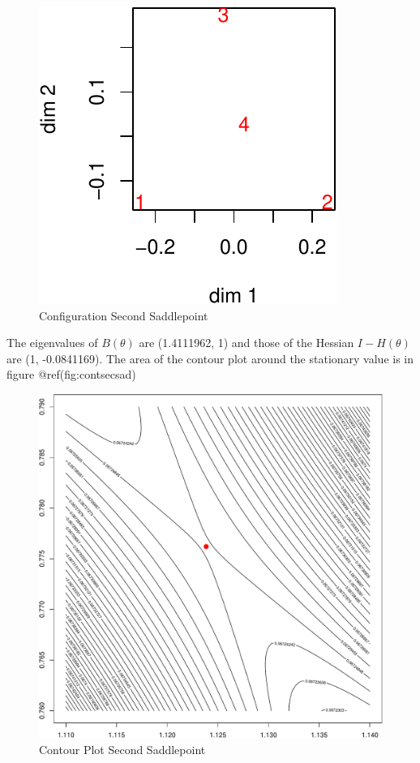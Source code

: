\documentclass[
  12pt,
  letterpaper,
  DIV=11,
  numbers=noendperiod]{scrreprt}
\theoremstyle{remark}
\begin{document}
\begin{figure}[H]

{\centering \includegraphics{spaces_files/figure-pdf/confsecsad-1.pdf}

}

\caption{Configuration Second Saddlepoint}

\end{figure}%

The eigenvalues of \(B(\theta)\) are (1.4111962, 1) and those of the
Hessian \(I-H(\theta)\) are (1, -0.0841169). The area of the contour
plot around the stationary value is in figure @ref(fig:contsecsad)

\begin{figure}[H]

{\centering \includegraphics{spaces_files/figure-pdf/contsecsad-1.pdf}

}

\caption{Contour Plot Second Saddlepoint}

\end{figure}%
\end{document}
